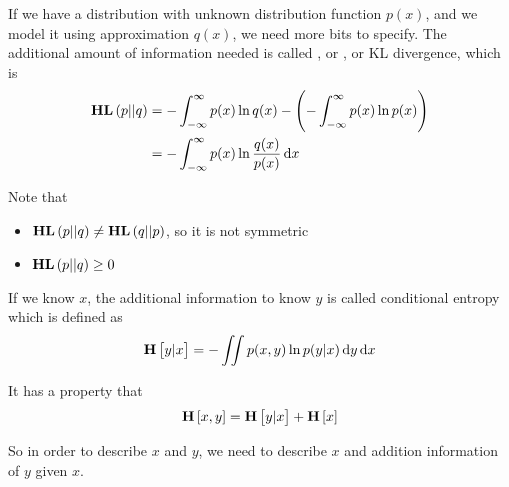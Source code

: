 \begin{definition}
    If we have a distribution with unknown distribution function $p(x)$, and we model it using approximation $q(x)$, we need more bits to specify. The additional amount of information needed is called , or , or KL divergence, which is
    \begin{equation}
        \begin{aligned}
            \kldivergence{p}{q} &= - \int_{-\infty}^{\infty} p(x) \ln q(x) - \left(- \int_{-\infty}^{\infty}  p(x) \ln p(x) \right) \\
            &= - \int_{-\infty}^{\infty} p(x) \ln \frac{q(x)}{p(x)} \dif x
        \end{aligned}        
    \end{equation}
    
    Note that 
    \begin{itemize}
        \item $\mathop{\bf HL\/}\left(\displaystyle p \middle| \middle| \displaystyle q \right) \neq \mathop{\bf HL\/}\left(\displaystyle q \middle| \middle| \displaystyle p \right)$, so it is not symmetric
        \item $\mathop{\bf HL\/}\left(\displaystyle p \middle| \middle| \displaystyle q \right) \geq 0$
    \end{itemize}
\end{definition}


\begin{definition}
    If we know $x$, the additional information to know $y$ is called conditional entropy which is defined as
    \begin{equation}
        \entropy{y | x} = - \iint p(x,y) \ln p(y | x) \dif y \dif x
    \end{equation}
    
    It has a property that
    \begin{equation}
        \mathop{\bf H\/}\left[\displaystyle x, y \right] = \mathop{\bf H\/}\left[\displaystyle y|x \right] + \mathop{\bf H\/}\left[\displaystyle x \right]
    \end{equation}
    
    So in order to describe $x$ and $y$, we need to describe $x$ and addition information of $y$ given $x$.
\end{definition}

